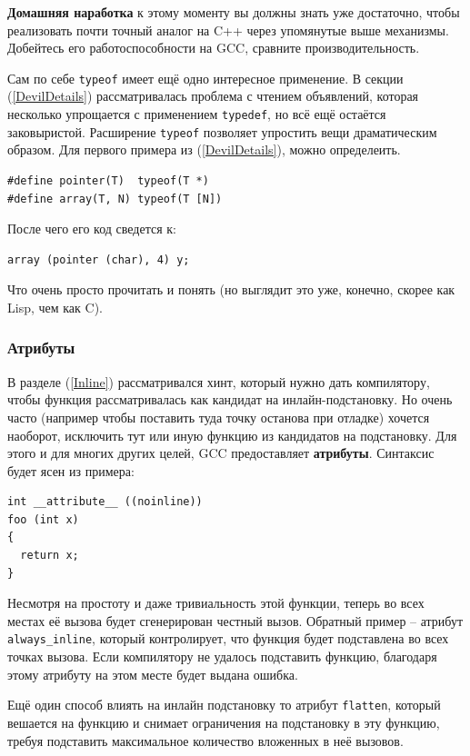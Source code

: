 \documentclass[a4paper,12pt,oneside]{article}
\begin{document}
\textbf{Домашняя наработка} к этому моменту вы должны знать уже достаточно, чтобы реализовать почти точный аналог на C++ через упомянутые выше механизмы. Добейтесь его работоспособности на GCC, сравните производительность.

Сам по себе \lstinline!typeof! имеет ещё одно интересное применение. В секции (\ref{DevilDetails}) рассматривалась проблема с чтением объявлений, которая несколько упрощается с применением \lstinline!typedef!, но всё ещё остаётся заковыристой. Расширение \lstinline!typeof! позволяет упростить вещи драматическим образом. Для первого примера из (\ref{DevilDetails}), можно определеить.

\begin{lstlisting}
#define pointer(T)  typeof(T *)
#define array(T, N) typeof(T [N])
\end{lstlisting}

После чего его код сведется к:

\begin{lstlisting}
array (pointer (char), 4) y;
\end{lstlisting}

Что очень просто прочитать и понять (но выглядит это уже, конечно, скорее как Lisp, чем как C).

\subsubsection{Атрибуты}

В разделе (\ref{Inline}) рассматривался хинт, который нужно дать компилятору, чтобы функция рассматривалась как кандидат на инлайн-подстановку. Но очень часто (например чтобы поставить туда точку останова при отладке) хочется наоборот, исключить тут или иную функцию из кандидатов на подстановку. Для этого и для многих других целей, GCC предоставляет \textbf{атрибуты}. Синтаксис будет ясен из примера:

\begin{lstlisting}
int __attribute__ ((noinline))
foo (int x)
{
  return x;
}
\end{lstlisting}

Несмотря на простоту и даже тривиальность этой функции, теперь во всех местах её вызова будет сгенерирован честный вызов. Обратный пример -- атрибут \lstinline!always_inline!, который контролирует, что функция будет подставлена во всех точках вызова. Если компилятору не удалось подставить функцию, благодаря этому атрибуту на этом месте будет выдана ошибка.

Ещё один способ влиять на инлайн подстановку то атрибут \lstinline!flatten!, который вешается на функцию и снимает ограничения на подстановку в эту функцию, требуя подставить максимальное количество вложенных в неё вызовов.
\end{document}
